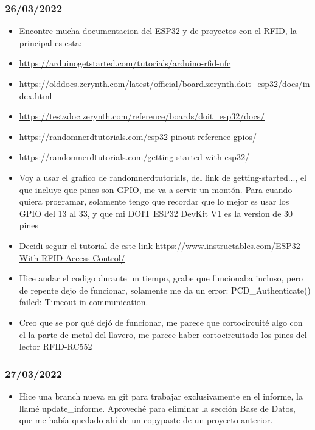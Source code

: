 \documentclass[../informe_krapp.tex]{subfiles}
\begin{document}
\subsubsection*{26/03/2022}
\begin{itemize}
	\item Encontre mucha documentacion del ESP32 y de proyectos con el RFID, la principal es esta:
	\item \url{https://arduinogetstarted.com/tutorials/arduino-rfid-nfc}
	\item \url{https://olddocs.zerynth.com/latest/official/board.zerynth.doit_esp32/docs/index.html}
	\item \url{https://testzdoc.zerynth.com/reference/boards/doit_esp32/docs/}
	\item \url{https://randomnerdtutorials.com/esp32-pinout-reference-gpios/}
	\item \url{https://randomnerdtutorials.com/getting-started-with-esp32/}
	\item Voy a usar el grafico de randomnerdtutorials, del link de getting-started...,
	      el que incluye que pines son GPIO, me va a servir un montón.
	      Para cuando quiera programar, solamente tengo que recordar que lo mejor es usar los
	      GPIO del 13 al 33, y que mi DOIT ESP32 DevKit V1 es la version de 30 pines
	\item Decidi seguir el tutorial de este link
	      \url{https://www.instructables.com/ESP32-With-RFID-Access-Control/}
	\item Hice andar el codigo durante un tiempo, grabe que funcionaba incluso, pero de
	      repente dejo de funcionar, solamente me da un error:
	      PCD\_Authenticate() failed: Timeout in communication.
	\item Creo que se por qué dejó de funcionar, me parece que cortocircuité algo
	      con el la parte de metal del llavero, me parece haber cortocircuitado
	      los pines del lector RFID-RC552
\end{itemize}

\subsubsection*{27/03/2022}
\begin{itemize}
	\item Hice una branch nueva en git para trabajar exclusivamente en el informe,
	      la llamé update\_informe.
	      Aproveché para eliminar la sección Base de Datos, que me había quedado ahí
	      de un copypaste de un proyecto anterior.
\end{itemize}
\end{document}
